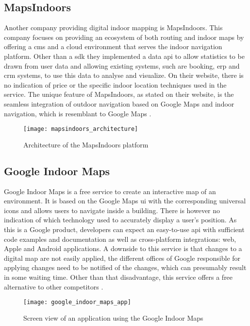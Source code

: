 \subsection{MapsIndoors}
Another company providing digital indoor mapping is MapsIndoors. This company focuses on providing an ecosystem of both routing and indoor maps by offering a \acrfull{cms} and a cloud environment that serves the indoor navigation platform. Other than a \acrshort{sdk} they implemented a data \acrshort{api} to allow statistics to be drawn from user data and allowing existing systems, such are booking, \acrfull{erp} and \acrfull{crm} systems, to use this data to analyse and visualize. On their website, there is no indication of price or the specific indoor location techniques used in the service. The unique feature of MapsIndoors, as stated on their website, is the seamless integration of outdoor navigation based on Google Maps and indoor navigation, which is resemblant to Google Maps \cite{MapsIndoors}.
\begin{figure}[h!]
\centering
\texttt{[image: mapsindoors\_architecture]}
\caption{Architecture of the MapsIndoors platform ~\cite{MapsIndoors}}
\label{fig:ips_topologies}
\end{figure}
\subsection{Google Indoor Maps}
Google Indoor Maps is a free service to create an interactive map of an environment. It is based on the Google Maps \acrshort{ui} with the corresponding universal icons and allows users to navigate inside a building. There is however no indication of which technology used to accurately display a user's position. As this is a Google product, developers can expect an easy-to-use \acrshort{api} with sufficient code examples and documentation as well as cross-platform integrations: web, Apple and Android applications. A downside to this service is that changes to a digital map are not easily applied, the different offices of Google responsible for applying changes need to be notified of the changes, which can presumably result in some waiting time.
Other than that disadvantage, this service offers a free alternative to other competitors \cite{Google}.
\begin{figure}[h!]
\centering
\texttt{[image: google\_indoor\_maps\_app]}
\caption{Screen view of an application using the Google Indoor Maps ~\cite{Google}}
\label{fig:ips_topologies}
\end{figure}
